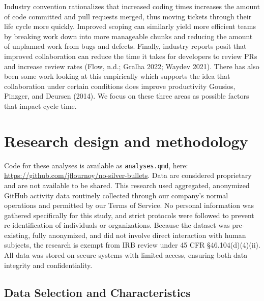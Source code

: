 \documentclass[
]{article}
\begin{document}
Industry convention rationalizes that increased coding times increases
the amount of code committed and pull requests merged, thus moving
tickets through their life cycle more quickly. Improved scoping can
similarly yield more efficient teams by breaking work down into more
manageable chunks and reducing the amount of unplanned work from bugs
and defects. Finally, industry reports posit that improved collaboration
can reduce the time it takes for developers to review PRs and increase
review rates (Flow, n.d.; Gralha 2022; Waydev 2021). There has also been
some work looking at this empirically which supports the idea that
collaboration under certain conditions does improve productivity
Gousios, Pinzger, and Deursen (2014). We focus on these three areas as
possible factors that impact cycle time.

\section{Research design and
methodology}\label{research-design-and-methodology}

Code for these analyses is available as \texttt{analyses.qmd}, here:
\url{https://github.com/jflournoy/no-silver-bullets}. Data are
considered proprietary and are not available to be shared. This research
used aggregated, anonymized GitHub activity data routinely collected
through our company's normal operations and permitted by our Terms of
Service. No personal information was gathered specifically for this
study, and strict protocols were followed to prevent re-identification
of individuals or organizations. Because the dataset was pre-existing,
fully anonymized, and did not involve direct interaction with human
subjects, the research is exempt from IRB review under 45 CFR
\S 46.104(d)(4)(ii). All data was stored on secure systems with limited
access, ensuring both data integrity and confidentiality.

\subsection{Data Selection and
Characteristics}\label{data-selection-and-characteristics}
\end{document}
